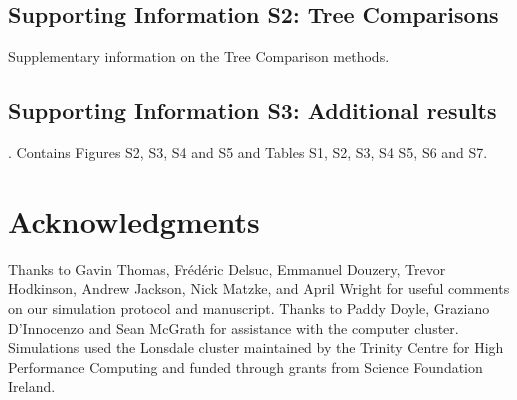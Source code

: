 \documentclass[10pt,letterpaper]{article}
\begin{document}
\subsection*{Supporting Information S2: Tree Comparisons}
\label{S2_Appendix2}
 Supplementary information on the Tree Comparison methods.

\subsection*{Supporting Information S3: Additional results}
\label{S3_Appendix3}
. Contains Figures S2, S3, S4 and S5 and Tables S1, S2, S3, S4 S5, S6 and S7.

\section*{Acknowledgments}
Thanks to Gavin Thomas, Fr\'{e}d\'{e}ric Delsuc, Emmanuel Douzery, Trevor Hodkinson, Andrew Jackson, Nick Matzke, and April Wright for useful comments on our simulation protocol and manuscript. Thanks to Paddy Doyle, Graziano D'Innocenzo and Sean McGrath for assistance with the computer cluster. Simulations used the Lonsdale cluster maintained by the Trinity Centre for High Performance Computing and funded through grants from Science Foundation Ireland.


\nolinenumbers




\end{document}
